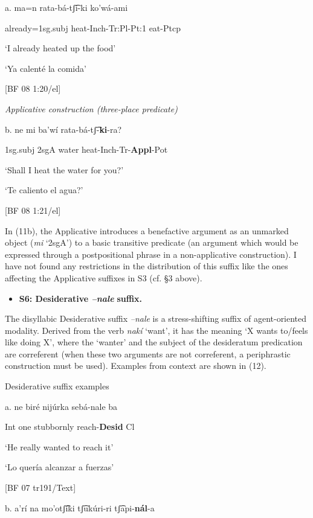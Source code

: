 a.  ma=n      rata-bá-tʃ͡i-ki    ko’wá-ami     

already=1sg.subj  heat-Inch-Tr:Pl-Pt:1  eat-Ptcp 

‘I already heated up the food’        

    ‘Ya calenté la comida’        

    [BF 08 1:20/el]

 \textit{Applicative construction (three-place predicate)}

b.   ne   mi  ba’wí  rata-bá-tʃ͡-\textbf{ki}{}-ra?

    1sg.subj  2sgA  water  heat-Inch-Tr-\textbf{Appl}{}-Pot

    ‘Shall I heat the water for you?’

    ‘Te caliento el agua?’          

    [BF 08 1:21/el]

  In (11b), the Applicative introduces a benefactive argument as an unmarked object (\textit{mi} ‘2sgA’) to a basic transitive predicate (an argument which would be expressed through a postpositional phrase in a non-applicative construction). I have not found any restrictions in the distribution of this suffix like the ones affecting the Applicative suffixes in S3 (cf. §3 above).

\begin{itemize}
\item \textbf{S6: Desiderative \textit{–nale} }\textbf{suffix.}
\end{itemize}

The disyllabic Desiderative suffix \textit{–nale} is a stress-shifting suffix of agent-oriented modality. Derived from the verb \textit{nakí} ‘want’, it has the meaning ‘X wants to/feels like doing X’, where the ‘wanter’ and the subject of the desideratum predication are correferent (when these two arguments are not correferent, a periphrastic construction must be used). Examples from context are shown in (12).

   Desiderative suffix examples

a.   ne   biré   nijúrka   sebá-nale   ba    

    Int  one  stubbornly  reach-\textbf{Desid}  Cl  

    ‘He really wanted to reach it’

 ‘Lo quería alcanzar a fuerzas’      

[BF 07 tr191/Text]

  b.   a’rí    na   mo’otʃ͡íki  tʃ͡ukúri-ri     tʃ͡api-\textbf{nál}{}-a 

